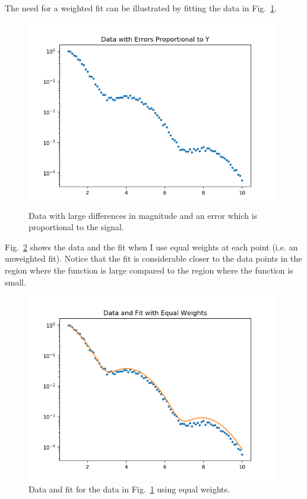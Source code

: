 \documentclass{scrartcl}
\begin{document}
The need for a weighted fit can be illustrated by fitting the
data in Fig.~\ref{fig:epropy}.
\begin{figure}
\begin{center}
\includegraphics[width=11cm]{epropy}
\end{center}
\caption{\label{fig:epropy}Data with large differences
in magnitude and an error which is proportional to the
signal.}
\end{figure}
Fig.~\ref{fig:dfeq} shows the data and the fit when I use
equal weights at each point (i.e. an unweighted fit). Notice
that the fit is considerable closer to the data points in the
region where the function is large compared to the region
where the function is small.
\begin{figure}
\begin{center}
\includegraphics[width=11cm]{dfeq}
\end{center}
\caption{\label{fig:dfeq}Data and fit for the data
in Fig.~\ref{fig:epropy} using equal weights.}
\end{figure}
\end{document}
